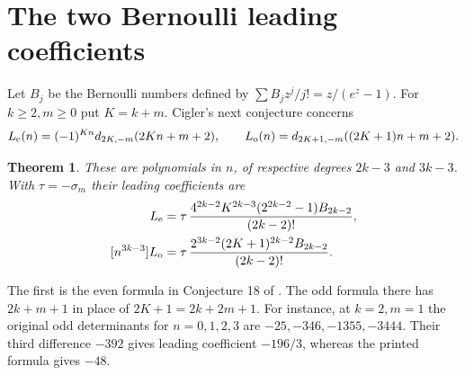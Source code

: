 \documentclass[11pt]{article}
\newtheorem{theorem}{Theorem}
\begin{document}
\section{The two Bernoulli leading coefficients}
Let $B_j$ be the Bernoulli numbers defined by $\sum B_jz^j/j!=z/(e^z-1)$. For $k\ge2,m\ge0$ put $K=k+m$. Cigler's next conjecture concerns
\[
 L_{\rm e}(n)=(-1)^{Kn}d_{2K,-m}(2Kn+m+2),\qquad
 L_{\rm o}(n)=d_{2K+1,-m}((2K+1)n+m+2).
\]
\begin{theorem}\label{bernoulli}
These are polynomials in $n$, of respective degrees $2k-3$ and $3k-3$. With $\tau=-\sigma_m$ their leading coefficients are
\begin{align*}
 [n^{2k-3}]L_{\rm e}
 &=\tau\,\frac{4^{2k-2}K^{2k-3}(2^{2k-2}-1)B_{2k-2}}{(2k-2)!},\\
 [n^{3k-3}]L_{\rm o}
 &=\tau\,\frac{2^{3k-2}(2K+1)^{2k-2}B_{2k-2}}{(2k-2)!}.
\end{align*}
\end{theorem}
The first is the even formula in Conjecture 18 of \cite{cigler}. The odd formula there has $2k+m+1$ in place of $2K+1=2k+2m+1$. For instance, at $k=2,m=1$ the original odd determinants for $n=0,1,2,3$ are $-25,-346,-1355,-3444$. Their third difference $-392$ gives leading coefficient $-196/3$, whereas the printed formula gives $-48$.
\end{document}
